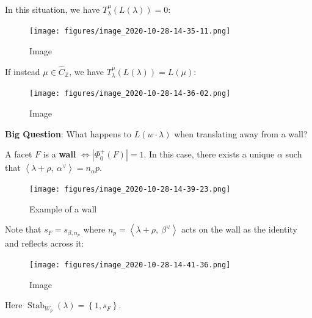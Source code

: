\begin{example}[?]

In this situation, we have \(T_\lambda^\mu(L(\lambda)) = 0\):

\begin{figure}
\centering
\texttt{[image: figures/image\_2020-10-28-14-35-11.png]}
\caption{Image}
\end{figure}

If instead \(\mu \in \widehat{C}_{\mathbb{Z}}\), we have
\(T_\lambda^\mu( L(\lambda)) = L(\mu)\):

\begin{figure}
\centering
\texttt{[image: figures/image\_2020-10-28-14-36-02.png]}
\caption{Image}
\end{figure}

\end{example}

\textbf{Big Question}: What happens to \(L(w\cdot \lambda)\) when
translating away from a wall?

\begin{definition}[Walls]

A facet \(F\) is a \textbf{wall}
\(\iff {\left\lvert { \Phi_0^+(F) } \right\rvert} = 1\). In this case,
there exists a unique \(\alpha\) such that
\({\left\langle {\lambda + \rho},~{\alpha^\vee} \right\rangle} = n_\alpha p\).

\begin{figure}
\centering
\texttt{[image: figures/image\_2020-10-28-14-39-23.png]}
\caption{Example of a wall}
\end{figure}

\end{definition}

\begin{remark}

Note that \(s_F = s_{\beta, n_p}\) where
\(n_p = {\left\langle {\lambda + \rho},~{\beta^\vee} \right\rangle}\)
acts on the wall as the identity and reflects across it:

\begin{figure}
\centering
\texttt{[image: figures/image\_2020-10-28-14-41-36.png]}
\caption{Image}
\end{figure}

Here \({\operatorname{Stab}}_{W_p}(\lambda) = \left\{{1, s_F}\right\}\).

\end{remark}

